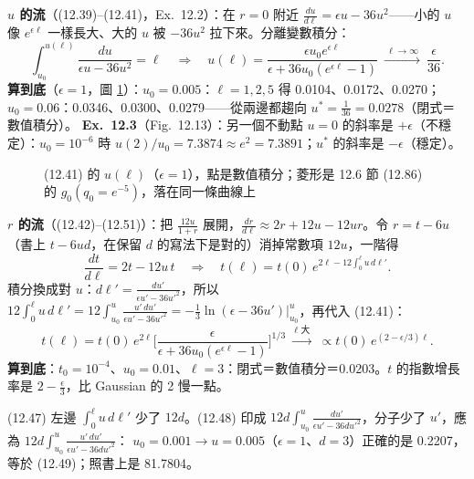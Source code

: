 \textbf{$u$ 的流}（(12.39)--(12.41)，Ex.~12.2）：在 $r=0$ 附近 $\frac{du}{d\ell}=\epsilon u-36u^2$——小的 $u$ 像 $e^{\epsilon\ell}$ 一樣長大、大的 $u$ 被 $-36u^2$ 拉下來。分離變數積分：
\[\int_{u_0}^{u(\ell)}\frac{du}{\epsilon u-36u^2}=\ell\quad\Rightarrow\quad u(\ell)=\frac{\epsilon u_0e^{\epsilon\ell}}{\epsilon+36u_0(e^{\epsilon\ell}-1)}\ \xrightarrow{\ \ell\to\infty\ }\ \frac{\epsilon}{36}.\tag{12.40--12.41}\]
\textbf{算到底}（$\epsilon=1$，圖 \ref{twelve-fig-u}）：$u_0=0.005$：$\ell=1,2,5$ 得 0.0104、0.0172、0.0270；$u_0=0.06$：0.0346、0.0300、0.0279——從兩邊都趨向 $u^*=\frac1{36}=0.0278$（閉式＝數值積分）。
\textbf{Ex.~12.3}（Fig.~12.13）：另一個不動點 $u=0$ 的斜率是 $+\epsilon$（不穩定）：$u_0=10^{-6}$ 時 $u(2)/u_0=7.3874\approx e^2=7.3891$；$u^*$ 的斜率是 $-\epsilon$（穩定）。

\begin{figure}[htbp]
\centering
\TwelveFigU
\caption{(12.41) 的 $u(\ell)$（$\epsilon=1$），點是數值積分；菱形是 12.6 節 (12.86) 的 $g_0(q_0=e^{-5})$，落在同一條曲線上}\label{twelve-fig-u}
\end{figure}

\textbf{$r$ 的流}（(12.42)--(12.51)）：把 $\frac{12u}{1+r}$ 展開，$\frac{dr}{d\ell}\approx2r+12u-12ur$。令 $r=t-6u$（書上 $t-6ud$，在保留 $d$ 的寫法下是對的）消掉常數項 $12u$，一階得
\[\frac{dt}{d\ell}=2t-12u\,t\quad\Rightarrow\quad t(\ell)=t(0)\,e^{2\ell-12\int_0^\ell u\,d\ell'}.\tag{12.45--12.46}\]
積分換成對 $u$：$d\ell'=\frac{du'}{\epsilon u'-36u'^2}$，所以 $12\int_0^\ell u\,d\ell'=12\int_{u_0}^{u}\frac{u'\,du'}{\epsilon u'-36u'^2}=-\frac13\ln(\epsilon-36u')\big|_{u_0}^{u}$，再代入 (12.41)：
\[t(\ell)=t(0)\,e^{2\ell}\Big[\frac{\epsilon}{\epsilon+36u_0(e^{\epsilon\ell}-1)}\Big]^{1/3}\ \xrightarrow{\ \ell\text{ 大}\ }\ \propto t(0)\,e^{(2-\epsilon/3)\ell}.\tag{12.49--12.51}\]
\textbf{算到底}：$t_0=10^{-4}$、$u_0=0.01$、$\ell=3$：閉式＝數值積分＝0.0203。$t$ 的指數增長率是 $2-\frac\epsilon3$，比 Gaussian 的 2 慢一點。
\begin{errbox}[p.~298，(12.47)(12.48)]
(12.47) 左邊 $\int_0^\ell u\,d\ell'$ 少了 $12d$。(12.48) 印成 $12d\int_{u_0}^u\frac{du'}{\epsilon u'-36du'^2}$，分子少了 $u'$，應為 $12d\int_{u_0}^u\frac{u'\,du'}{\epsilon u'-36du'^2}$：
$u_0=0.001\to u=0.005$（$\epsilon=1$、$d=3$）正確的是 0.2207，等於 (12.49)；照書上是 81.7804。
\end{errbox}

